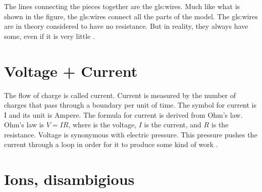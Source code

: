 \documentclass[../../Orator]{subfiles}
\begin{document}
The lines connecting the pieces together are the \gls{gls:wires}. Much like what is shown in the figure, the \gls{gls:wires} connect all the parts of the model. The \gls{gls:wires} are in theory considered to have no resistance. But in reality, they always have some, even if it is very little \cite{}. 


 \section{Voltage + Current}
The flow of charge is called current. Current is measured by the number of charges that pass through a boundary per unit of time. The symbol for current is I and its unit is Ampere. The formula for current is derived from Ohm's law. Ohm's law is \(V=IR\), where  is the voltage, \(I\) is the current, and \(R\) is the resistance. Voltage is synonymous with electric pressure. This pressure pushes the current through a loop in order for it to produce some kind of work \cite{}. 


\section{Ions, disambigious}


\end{document}
